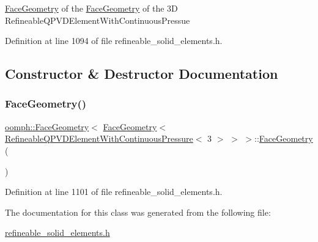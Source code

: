 \hyperlink{classoomph_1_1FaceGeometry}{Face\+Geometry} of the \hyperlink{classoomph_1_1FaceGeometry}{Face\+Geometry} of the 3D Refineable\+Q\+P\+V\+D\+Element\+With\+Continuous\+Pressue 

Definition at line 1094 of file refineable\+\_\+solid\+\_\+elements.\+h.



\subsection{Constructor \& Destructor Documentation}
\mbox{\label{classoomph_1_1FaceGeometry_3_01FaceGeometry_3_01RefineableQPVDElementWithContinuousPressure_3_013_01_4_01_4_01_4_a40e756f4f92c70ec09f1cb09883d7c95}} 
\subsubsection{\texorpdfstring{Face\+Geometry()}{FaceGeometry()}}
{\footnotesize\ttfamily \hyperlink{classoomph_1_1FaceGeometry}{oomph\+::\+Face\+Geometry}$<$ \hyperlink{classoomph_1_1FaceGeometry}{Face\+Geometry}$<$ \hyperlink{classoomph_1_1RefineableQPVDElementWithContinuousPressure}{Refineable\+Q\+P\+V\+D\+Element\+With\+Continuous\+Pressure}$<$ 3 $>$ $>$ $>$\+::\hyperlink{classoomph_1_1FaceGeometry}{Face\+Geometry} (\begin{DoxyParamCaption}{ }\end{DoxyParamCaption})\hspace{0.3cm}{\ttfamily [inline]}}



Definition at line 1101 of file refineable\+\_\+solid\+\_\+elements.\+h.



The documentation for this class was generated from the following file\+:\begin{DoxyCompactItemize}
\item 
\hyperlink{refineable__solid__elements_8h}{refineable\+\_\+solid\+\_\+elements.\+h}\end{DoxyCompactItemize}
